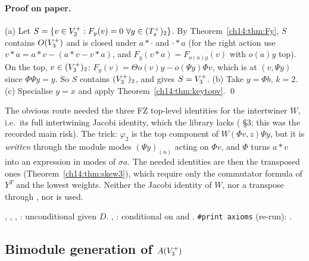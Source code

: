 \paragraph{Proof on paper.}  (a) Let $S=\{v\in V_3^{+}:F_y(v)=0\ \forall y\in(T_s^+)_2\}$.  By
Theorem~\ref{ch14:thm:Fy}, $S$ contains $O(V_3^{+})$ and is closed under $a*\cdot$ and $\cdot*a$ (for the right
action use $v*a=a*v-(a*v-v*a)$, and $F_y(v*a)=F_{o(a)y}(v)$ with $o(a)y$ top).  On the top, $v\in(V_3^{+})_2$:
$F_y(v)=\Theta o(v)y-o(\Psi y)\Phi v$, which is  at $(v,\Psi y)$ since $\Phi\Psi y=y$.  So $S$
contains $(V_3^{+})_2$, and  gives $S=V_3^{+}$.  (b) Take $y=\Phi b$, $k=2$.  (c) Specialise
$y=x$ and apply Theorem~\ref{ch14:thm:keytopv}. \qed

\begin{warning}[title={Trap / dead end: How the intertwining Jacobi identity of $W$ was avoided}]
The obvious route needed the three FZ top-level identities for the intertwiner $W$, i.e.\ its full
intertwining Jacobi identity, which the library lacks ( \S3; this was the
recorded main risk).  The trick: $\varphi_2$ is the top component of $W(\Phi v,z)\Psi y$, but it is
\emph{written} through the module modes $(\Psi y)_{(n)}$ acting on $\Phi v$, and $\Phi$ turns $a*v$ into an
expression in modes of $\sigma a$.  The needed identities are then the transposed ones
(Theorem~\ref{ch14:thm:skew3}), which require only the commutator formula of $Y^T$ and the lowest
weights.  Neither the Jacobi identity of $W$, nor a transpose through , nor
 is used.
\end{warning}

\begin{status}
, , , : unconditional given $D$.
, : conditional on  and .
\texttt{\#print axioms}  (re-run): .
\end{status}

\subsection{\texorpdfstring{Bimodule generation of $A(V_3^{+})$}{Bimodule generation of A(V3+)}}

